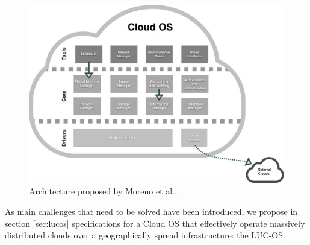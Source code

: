 
\begin{figure}
	\centering
	\vspace*{-1cm}
	\includegraphics[width=1.1\linewidth]{Figures/moreno.pdf}
	\caption{Architecture proposed by Moreno et al.\cite{moreno2012iaas}.}%
	\label{fig:moreno}%
\end{figure}

As main challenges that need to be solved have been introduced, we propose in 
section \ref{sec:lucos} specifications for a Cloud OS that effectively operate
massively distributed clouds over a geographically spread infrastructure: the 
LUC-OS.

